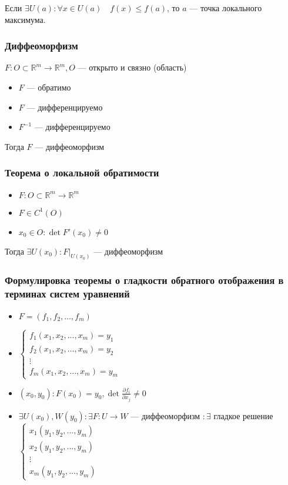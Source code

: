 \documentclass{article}
\begin{document}
Если $\exists U(a): \forall x \in U(a) \quad f(x) \le f(a)$, то $a$ --- точка локального максимума.

\subsubsection{Диффеоморфизм}
$F: O \subset \mathbb{R}^m \rightarrow \mathbb{R}^m, O$ --- открыто и связно (область)
\begin{itemize}
    \item $F$ --- обратимо
    \item $F$ --- дифференцируемо
    \item $F^{-1}$ --- дифференцируемо
\end{itemize}

Тогда $F$ --- диффеоморфизм

\subsubsection{Теорема о локальной обратимости}

\begin{itemize}
    \item $F: O \subset \mathbb{R}^m \rightarrow \mathbb{R}^m$
    \item $F \in C^1(O)$
    \item $x_0 \in O: \det F'(x_0) \neq 0$
\end{itemize}

Тогда $\exists U(x_0): F|_{U(x_0)}$ --- диффеоморфизм

\subsubsection{Формулировка теоремы о  гладкости обратного отображения в терминах систем уравнений}

\begin{itemize}
    \item $F = (f_1, f_2, \ldots, f_m)$
    \item $\begin{cases}
        f_1(x_1, x_2, \ldots, x_m) = y_1\\
        f_2(x_1, x_2, \ldots, x_m) = y_2\\
        \vdots\\
        f_m(x_1, x_2, \ldots, x_m) = y_m
    \end{cases}$
    \item $(x_0, y_0): F(x_0) = y_0, \det \frac{\partial f_i}{\partial x_j} \neq 0$
    \item $\exists U(x_0), W(y_0): \exists F: U \rightarrow W$ --- диффеоморфизм $: \exists $ гладкое решение $ \begin{cases}
        x_1(y_1, y_2, \ldots, y_m)\\
        x_2(y_1, y_2, \ldots, y_m)\\
        \vdots\\
        x_m(y_1, y_2, \ldots, y_m)
    \end{cases}$
\end{itemize}
\end{document}
